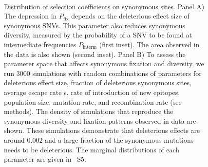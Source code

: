 \documentclass[11pt]{article}
\newcommand{\pfix}{P_{\mathrm{fix}}}
\newcommand{\marginals}{5}
\begin{document}
\begin{figure}
\begin{center}
\\
\caption{Distribution of selection coefficients on synonymous sites. Panel A)
The depression in $\pfix$ depends on the deleterious effect size 
of synonymous SNVs. This parameter also reduces synonymous
diversity, measured by the probability of a SNV to be found at
intermediate frequencies $P_\text{interm}$ (first inset). The area observed in
the data is also shown (second inset).
Panel B) To assess the parameter space that affects synonymous fixation and
diversity, we run 3000 simulations with random combinations of parameters for deleterious effect
size, fraction of deleterious synonymous sites, average escape rate $\epsilon$,
rate of introduction of new epitopes, population size, mutation rate, and
recombination rate (see methods). The density of simulations that reproduce
the synonymous diversity and fixation patterns observed in data are shown.
These simulations demonstrate that deleterious effects are around $0.002$
and a large fraction of the synonymous mutations needs to be
deleterious. The marginal distributions of each parameter are given in
\figurename~S\marginals.} 
\label{fig:simheat}
\end{center}
\end{figure}

%
\end{document}
